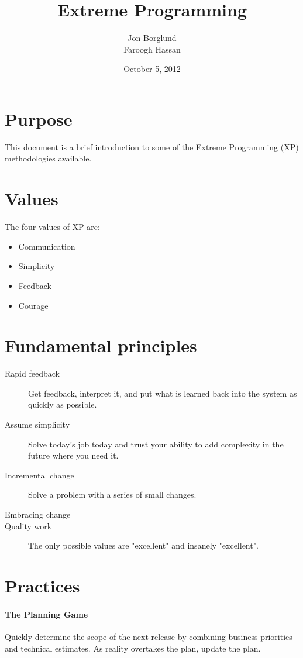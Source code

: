 \documentclass[12pt]{article}
\title{Extreme Programming}			%
\author{Jon Borglund \\ Faroogh Hassan}		%
\date{October 5, 2012}					%
\begin{document}
\maketitle					%

\section{Purpose}
This document is a brief introduction to some of the Extreme Programming (XP) methodologies available.

\section{Values}
The four values of XP are: 
\begin{itemize}
\item Communication 
\item Simplicity 
\item Feedback 
\item Courage 
\end{itemize}


\section{Fundamental principles}
\begin{description}
\item[Rapid feedback] Get feedback, interpret it, and put what is learned back into the system as quickly as possible. 
\item[Assume simplicity] Solve today's job today and trust your ability to add complexity in the future where you need it.
\item[Incremental change] Solve a problem with a series of small changes.
\item[Embracing change] 
\item[Quality work] The only possible values are "excellent" and insanely "excellent". 
\end{description}

\section{Practices}
\paragraph{The Planning Game} Quickly determine the scope of the next release by 
combining business priorities and technical estimates. As reality overtakes the 
plan, update the plan. 
\end{document}
